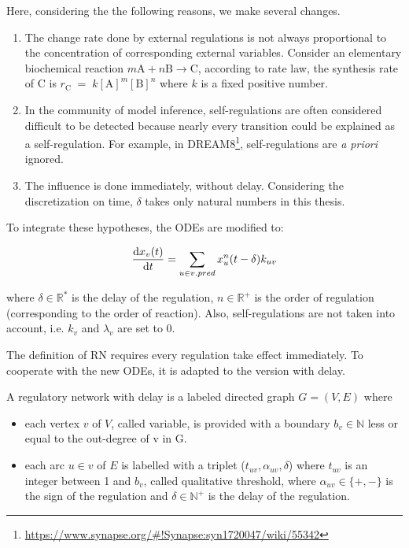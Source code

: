 Here, considering the the following reasons, we make several changes.
\begin{enumerate}
    \item The change rate done by external regulations is not always proportional to the concentration of corresponding external variables. 
    Consider an elementary biochemical reaction $m\mathrm  {A}+n\mathrm  {B}\rightarrow \mathrm  {C}$, according to rate law, the synthesis rate of C is $r_{\mathrm  {C}}\;=\;k[{\mathrm  {A}}]^{m}[{\mathrm  {B}}]^{n}$ where $k$ is a fixed positive number.
    \item In the community of model inference, self-regulations are often considered difficult to be detected because nearly every transition could be explained as a self-regulation.
    For example, in DREAM8\footnote{\url{https://www.synapse.org/\#!Synapse:syn1720047/wiki/55342}}, self-regulations are \textit{a priori} ignored.  
    \item The influence is done immediately, without delay.
    Considering the discretization on time, $\delta$ takes only natural numbers in this thesis.
\end{enumerate}

To integrate these hypotheses, the ODEs are modified to:

\begin{equation}\label{eq:ode}
    \dfrac{{\rm d}x_v(t)}{{\rm d}t}=\sum_{u\in v.pred}{x_u^{n}(t-\delta)k_{uv}}
\end{equation}


where $\delta\in \mathbb{R}^{*}$ is the delay of the regulation, $n\in \mathbb{R}^{+}$ is the order of regulation (corresponding to the order of reaction).
Also, self-regulations are not taken into account, i.e. $k_v$ and $\lambda_v$ are set to 0.

The definition of RN requires every regulation take effect immediately.
To cooperate with the new ODEs, it is adapted to the version with delay.

\begin{definition}
A regulatory network with delay is a labeled directed graph $G=(V,E)$ where 
\begin{itemize}
    \item each vertex $v$ of $V$, called variable, is provided with a boundary $b_v\in \mathbb{N}$ less or equal to the out-degree of v in G.
    \item each arc $u\in v$ of $E$ is labelled with a triplet ($t_{uv}, \alpha_{uv}, \delta$) where $t_{uv}$ is an integer between 1 and $b_v$, called qualitative threshold, where $\alpha_{uv}\in \{+,-\}$ is the sign of the regulation and $\delta\in \mathbb{N^+}$ is the delay of the regulation.
\end{itemize}
\end{definition}

